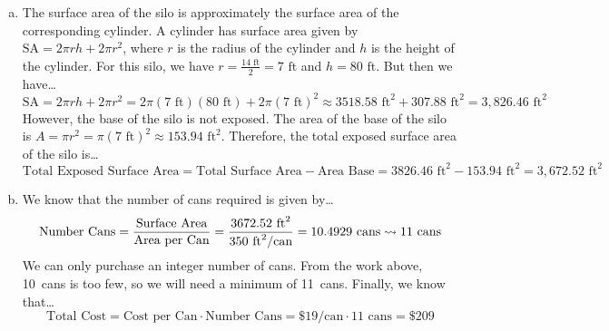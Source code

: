 \documentclass[11pt,letterpaper]{article}
\begin{document}
\sol 
\begin{enumerate}[(a)]
\item The surface area of the silo is approximately the surface area of the corresponding cylinder. A cylinder has surface area given by $\text{SA}= 2\pi rh + 2\pi r^2$, where $r$ is the radius of the cylinder and $h$ is the height of the cylinder. For this silo, we have $r= \frac{14 \text{ ft}}{2}= 7 \text{ ft}$ and $h= 80 \text{ ft}$. But then we have\dots
	\[
	\text{SA}= 2\pi rh + 2\pi r^2= 2 \pi (7 \text{ ft}) (80 \text{ ft}) + 2 \pi (7 \text{ ft})^2 \approx 3518.58 \text{ ft}^2 + 307.88 \text{ ft}^2= 3,\!826.46 \text{ ft}^2
	\] 
However, the base of the silo is not exposed. The area of the base of the silo is $A= \pi r^2= \pi (7 \text{ ft})^2 \approx 153.94 \text{ ft}^2$. Therefore, the total exposed surface area of the silo is\dots
	\[
	\text{Total Exposed Surface Area}= \text{Total Surface Area} - \text{Area Base}= 3826.46 \text{ ft}^2 - 153.94 \text{ ft}^2= 3,\!672.52 \text{ ft}^2
	\] \pspace

\item We know that the number of cans required is given by\dots
	\[
	\text{Number Cans}= \frac{\text{Surface Area}}{\text{Area per Can}}= \frac{3672.52 \text{ ft}^2}{350 \text{ ft}^2/\text{can}}= 10.4929 \text{ cans} \rightsquigarrow 11 \text{ cans}
	\]
We can only purchase an integer number of cans. From the work above, 10~cans is too few, so we will need a minimum of 11~cans. Finally, we know that\dots
	\[
	\text{Total Cost}= \text{Cost per Can} \cdot \text{Number Cans}= \$19/\text{can} \cdot 11 \text{ cans}= \$209
	\] \pspace


\end{enumerate}
\end{document}
